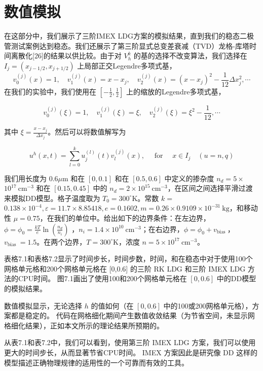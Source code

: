 \section{数值模拟}
在这部分中，我们展示了三阶IMEX LDG方案的模拟结果，直到我们的稳态二极管测试案例达到稳态。我们还展示了第三阶显式总变差衰减（TVD）龙格-库塔时间离散化[26]的结果以供比较。由于对 $V_{h}^{k}$ 的基的选择不改变算法，我们选择在 $I_{j}=\left(x_{j-1 / 2}, x_{j+1 / 2}\right)$ 上局部正交Legendre多项式基，
$$
    v_{0}^{(j)}(x)=1, \quad v_{1}^{(j)}(x)=x-x_{j}, \quad v_{2}^{(j)}(x)=\left(x-x_{j}\right)^{2}-\frac{1}{12} \Delta x_{j}^{2}, \cdots
$$
在我们的实验中，我们使用在 $\left[-\frac{1}{2}, \frac{1}{2}\right]$ 上的缩放的Legendre多项式基，

$$
    v_{0}^{(j)}(\xi)=1, \quad v_{1}^{(j)}(\xi)=\xi, \quad v_{2}^{(j)}(\xi)=\xi^{2}-\frac{1}{12}, \cdots
$$

其中 $\xi=\frac{x-x_{j}}{\Delta x_{j}}$。然后可以将数值解写为

$$
    u^{h}(x, t)=\sum_{l=0}^{k} u_{j}^{(l)}(t) v_{l}^{(j)}(x), \quad \text { for } \quad x \in I_{j} \quad(u=n, q)
$$

我们用长度为 $0.6 \mu \mathrm{m}$ 和在 $[0,0.1]$ 和在 $[0.5,0.6]$ 中定义的掺杂度 $n_{d}=5 \times$ $10^{17} \mathrm{~cm}^{-3}$ 和在 $[0.15,0.45]$ 中的 $n_{d}=2 \times 10^{15} \mathrm{~cm}^{-3}$，在区间之间选择平滑过渡来模拟DD模型。格子温度取为 $T_{0}=300^{\circ} \mathrm{K}$。常数 $k=$ $0.138 \times 10^{-4}, \varepsilon=11.7 \times 8.85418, e=0.1602, m=0.26 \times 0.9109 \times 10^{-31} \mathrm{~kg}$，和移动性 $\mu=0.75$，在我们的单位中。给出如下的边界条件：在左边界，$\phi=\phi_{0}=\frac{k T}{e} \ln \left(\frac{n_{d}}{n_{i}}\right)$ ，$n_{i}=1.4 \times 10^{10} \mathrm{~cm}^{-3}$；在右边界，$\phi=\phi_{0}+v_{\text {bias }}$， $v_{\text {bias }}=1.5$。在两个边界，$T=300^{\circ} \mathrm{K}$，浓度 $n=5 \times 10^{17} \mathrm{~cm}^{-3}$。

表格7.1和表格7.2显示了时间步长，时间步数，时间，和在稳态中对于使用100个网格单元格和200个网格单元格在 [0,0.6] 的三阶 RK LDG 和三阶 IMEX LDG 方法的CPU时间。 图7.1画出了使用100和200个网格单元格在 $[0,0.6]$ 中的DD模型的模拟结果。

数值模拟显示，无论选择 $h$ 的值如何（在 $[0,0.6]$ 中的100或200网格单元格），方案都是稳定的。 代码在网格细化期间产生数值收敛结果（为节省空间，未显示网格细化结果），正如本文所示的理论结果所预期的。

从表7.1和表7.2中，我们可以看到，使用第三阶 IMEX LDG 方案，我们可以使用更大的时间步长，从而显著节省CPU时间。 IMEX 方案因此是研究像 DD 这样的模型描述正确物理规律的适用性的一个可靠而有效的工具。

